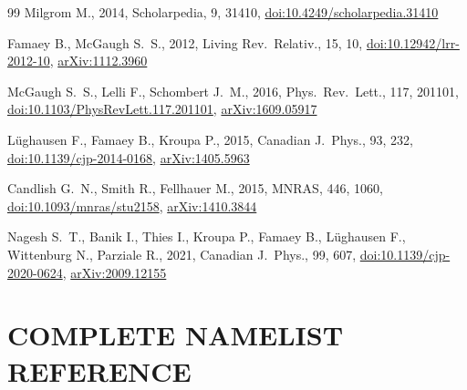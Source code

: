 \documentclass[fleqn,usenatbib]{mnras}
\begin{document}
\begin{thebibliography}{99}
Milgrom M., 2014, Scholarpedia, 9, 31410,
\href{https://doi.org/10.4249/scholarpedia.31410}{doi:10.4249/scholarpedia.31410}

Famaey B., McGaugh S.~S., 2012, Living Rev.\ Relativ., 15, 10,
\href{https://doi.org/10.12942/lrr-2012-10}{doi:10.12942/lrr-2012-10},
\href{https://arxiv.org/abs/1112.3960}{arXiv:1112.3960}

McGaugh S.~S., Lelli F., Schombert J.~M., 2016, Phys.\ Rev.\ Lett., 117, 201101,
\href{https://doi.org/10.1103/PhysRevLett.117.201101}{doi:10.1103/PhysRevLett.117.201101},
\href{https://arxiv.org/abs/1609.05917}{arXiv:1609.05917}

L{\"u}ghausen F., Famaey B., Kroupa P., 2015, Canadian J.\ Phys., 93, 232,
\href{https://doi.org/10.1139/cjp-2014-0168}{doi:10.1139/cjp-2014-0168},
\href{https://arxiv.org/abs/1405.5963}{arXiv:1405.5963}

Candlish G.~N., Smith R., Fellhauer M., 2015, MNRAS, 446, 1060,
\href{https://doi.org/10.1093/mnras/stu2158}{doi:10.1093/mnras/stu2158},
\href{https://arxiv.org/abs/1410.3844}{arXiv:1410.3844}

Nagesh S.~T., Banik I., Thies I., Kroupa P., Famaey B., L{\"u}ghausen F., Wittenburg N., Parziale R., 2021, Canadian J.\ Phys., 99, 607,
\href{https://doi.org/10.1139/cjp-2020-0624}{doi:10.1139/cjp-2020-0624},
\href{https://arxiv.org/abs/2009.12155}{arXiv:2009.12155}

\end{thebibliography}


\appendix

\section{COMPLETE NAMELIST REFERENCE}
\label{app:namelist}
\end{document}
